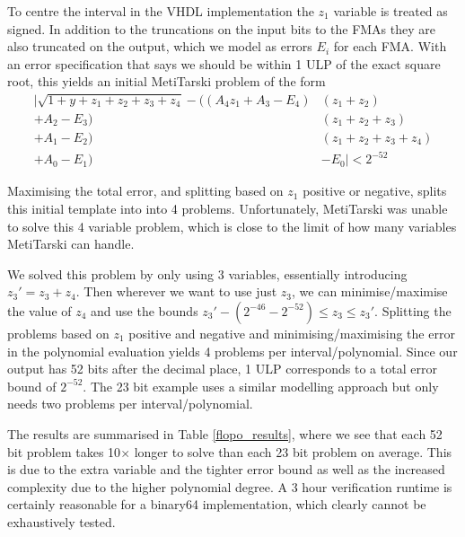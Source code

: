 \documentclass{fac}
\begin{document}
To centre the interval in the VHDL implementation the $z_1$ variable is treated as signed. In addition to the truncations on the input bits to the FMAs they are also truncated on the output, which we model as errors $E_i$ for each FMA\@. With an error specification that says we should be within 1 ULP of the exact square root, this yields an initial MetiTarski problem of the form
\begin{align*}
    |\sqrt{1+y+z_1+z_2+z_3+z_4} - ((A_4  z_1 + A_3 - E_4) & (z_1+z_2)\\
                                  + A_2 - E_3) & (z_1+z_2+z_3)\\
                                  + A_1 - E_2) & (z_1+z_2+z_3+z_4)\\
                                  + A_0 - E_1) &- E_0 | < 2^{-52}
\end{align*}

Maximising the total error, and splitting based on $z_1$ positive or negative, splits this initial template into into 4 problems.
Unfortunately, MetiTarski was unable to solve this 4 variable problem, which is close to the limit of how many variables MetiTarski can handle. 

We solved this problem by only using 3 variables, essentially introducing $z_3' = z_3+z_4$. Then wherever we want to use just $z_3$, we can minimise/maximise the value of $z_4$ and use the bounds $z_3' - (2^{-46} - 2^{-52}) \leq z_3 \leq z_3'$. Splitting the problems based on $z_1$ positive and negative and minimising/maximising the error in the polynomial evaluation yields 4 problems per interval/polynomial. Since our output has 52 bits after the decimal place, 1 ULP corresponds to a total error bound of $2^{-52}$. The 23 bit example uses a similar modelling approach but only needs two problems per interval/polynomial. 

The results are summarised in Table \ref{flopo_results}, where we see that each 52 bit problem takes 10$\times$ longer to solve than each 23 bit problem on average. This is due to the extra variable and the tighter error bound as well as the increased complexity due to the higher polynomial degree. A 3 hour verification runtime is certainly reasonable for a binary64 implementation, which clearly cannot be exhaustively tested.

\end{document}
